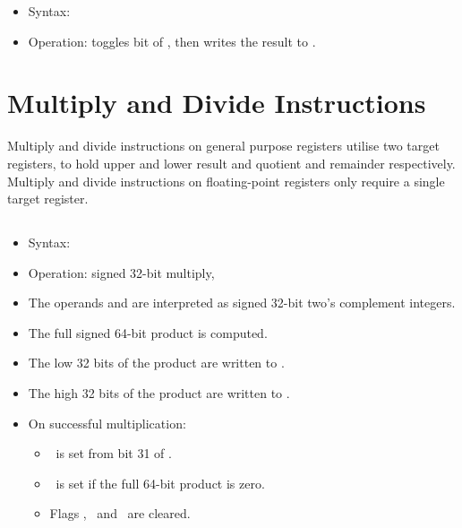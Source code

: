 \begin{itemize}
\item Syntax: 
\item Operation: toggles bit  of , then writes the
      result to .
\end{itemize}

\section{Multiply and Divide Instructions}

Multiply and divide instructions on general purpose registers utilise two
target registers, to hold upper and lower result and quotient and remainder
respectively. Multiply and divide instructions on floating-point registers
only require a single target register.

\subsection{}

\begin{itemize}
  \item Syntax: 
  \item Operation: signed 32-bit multiply, 
  \item The operands  and  are interpreted as signed 32-bit
        two's complement integers.
  \item The full signed 64-bit product is computed.
  \item The low 32 bits of the product are written to .
  \item The high 32 bits of the product are written to .
  \item On successful multiplication:
  \begin{itemize}
  \item \flagN\ is set from bit 31 of .
  \item \flagZ\ is set if the full 64-bit product is zero.
  \item Flags \flagC, \flagV\ and \flagE\ are cleared.
  \end{itemize}
\end{itemize}

\subsection{}

